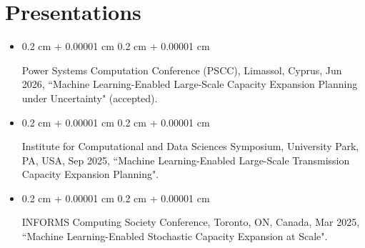 \documentclass[10pt, letterpaper]{article}
\newenvironment{onecolentry}{
    \begin{adjustwidth}{
        0.2 cm + 0.00001 cm
    }{
        0.2 cm + 0.00001 cm
    }
}{
    \end{adjustwidth}
} %
\begin{document}
    \section{Presentations}
    \begin{itemize}
    \item \begin{samepage}
        \begin{onecolentry}
        Power Systems Computation Conference (PSCC), Limassol, Cyprus, Jun 2026, ``Machine Learning-Enabled Large-Scale Capacity Expansion Planning under Uncertainty" (accepted).
        \end{onecolentry}
    \end{samepage}
    \item \begin{samepage}
            \begin{onecolentry}
            Institute for Computational and Data Sciences Symposium, University Park, PA, USA, Sep 2025, ``Machine Learning-Enabled Large-Scale Transmission Capacity Expansion Planning". 
            \end{onecolentry}
        \end{samepage}
    \item \begin{samepage}
            \begin{onecolentry}
            INFORMS Computing Society Conference, Toronto, ON, Canada, Mar 2025, ``Machine Learning-Enabled Stochastic Capacity Expansion at Scale". 
            \end{onecolentry}
        \end{samepage}


    \end{itemize}
\end{document}
